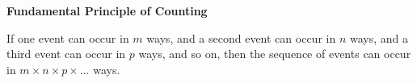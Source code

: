 \begin{center}
\textbf{Fundamental Principle of Counting}
\end{center}

\vspace*{1ex}

If one event can occur in $m$ ways,  and a second event can occur in $n$ ways, and a third event can occur in $p$ ways, and so on, then the sequence of events can occur in $m \times n \times p \times \ldots$ ways.
